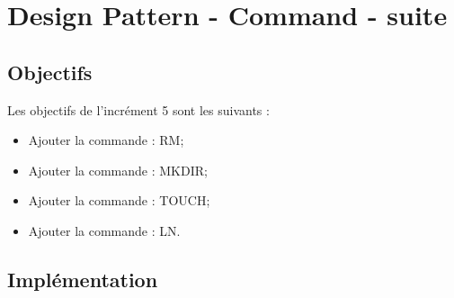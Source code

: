 
\newpage
\section{Design Pattern - Command - suite}

\subsection{Objectifs}

Les objectifs de l'incrément 5 sont les suivants :\\
\begin{itemize}
\item Ajouter la commande : RM;
\item Ajouter la commande : MKDIR;
\item Ajouter la commande : TOUCH;
\item Ajouter la commande : LN.\\
\end{itemize}

\subsection{Implémentation}